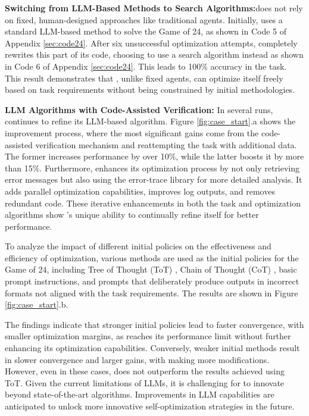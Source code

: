 \noindent\textbf{Switching from LLM-Based Methods to Search Algorithms:}\quad \framework does not rely on fixed, human-designed approaches like traditional agents. Initially, \framework uses a standard LLM-based method to solve the Game of 24, as shown in Code 5 of Appendix \ref{sec:code24}. After six unsuccessful optimization attempts, \framework completely rewrites this part of its code, choosing to use a search algorithm instead as shown in Code 6 of Appendix \ref{sec:code24}. This leads to 100\% accuracy in the task. This result demonstrates that \framework, unlike fixed agents, can optimize itself freely based on task requirements without being constrained by initial methodologies.

\noindent\textbf{LLM Algorithms with Code-Assisted Verification:} \quad
In several runs, \framework continues to refine its LLM-based algorithm. Figure \ref{fig:case_start}.a shows the improvement process, where the most significant gains come from the code-assisted verification mechanism and reattempting the task with additional data. The former increases performance by over 10\%, while the latter boosts it by more than 15\%. Furthermore, \framework enhances its optimization process by not only retrieving error messages but also using the error-trace library for more detailed analysis. It adds parallel optimization capabilities, improves log outputs, and removes redundant code. These iterative enhancements in both the task and optimization algorithms show \framework{}’s unique ability to continually refine itself for better performance.

To analyze the impact of different initial policies on the effectiveness and efficiency of optimization, various methods are used as the initial policies for the Game of 24, including Tree of Thought (ToT) \citep{yao2023treethoughtsdeliberateproblem}, Chain of Thought (CoT) \citep{wei2022chain}, basic prompt instructions, and prompts that deliberately produce outputs in incorrect formats not aligned with the task requirements. The results are shown in Figure \ref{fig:case_start}.b.

The findings indicate that stronger initial policies lead to faster convergence, with smaller optimization margins, as \framework reaches its performance limit without further enhancing its optimization capabilities. Conversely, weaker initial methods result in slower convergence and larger gains, with \framework making more modifications. However, even in these cases, \framework does not outperform the results achieved using ToT. Given the current limitations of LLMs, it is challenging for \framework to innovate beyond state-of-the-art algorithms. Improvements in LLM capabilities are anticipated to unlock more innovative self-optimization strategies in the future.
